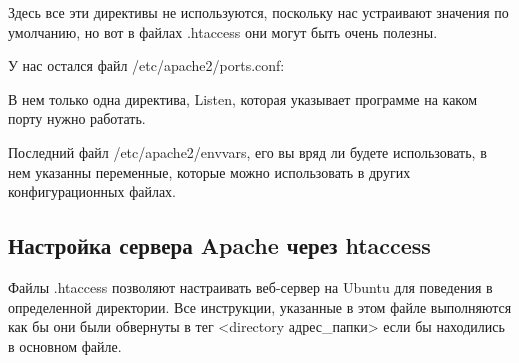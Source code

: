 \documentclass[14pt, a4paper]{article}
\begin{document}
Здесь все эти директивы не используются, поскольку нас устраивают значения по умолчанию, 
но вот в файлах .htaccess они могут быть очень полезны.

У нас остался файл /etc/apache2/ports.conf:
\begin{figure}[h]%
    \centering
    \label{1.6}
\end{figure}
В нем только одна директива, Listen, которая указывает программе на каком порту нужно работать.

Последний файл /etc/apache2/envvars, его вы вряд ли будете использовать, в нем указанны переменные, которые можно использовать в других конфигурационных файлах.
\begin{figure}[h]%
    \centering
    \label{1.7}
\end{figure}


\subsection*{Настройка сервера Apache через htaccess}
Файлы .htaccess позволяют настраивать веб-сервер на Ubuntu для поведения в определенной директории. 
Все инструкции, указанные в этом файле выполняются как бы они были обвернуты в тег <directory адрес\_папки> 
если бы находились в основном файле.
\end{document}
